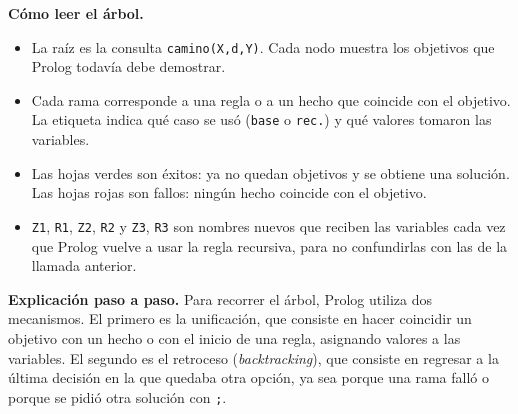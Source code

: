 \documentclass[12pt,letterpaper]{article}
\begin{document}
\noindent\textbf{Cómo leer el árbol.}
\begin{itemize}
  \item La raíz es la consulta \texttt{camino(X,d,Y)}. Cada nodo muestra los
  objetivos que Prolog todavía debe demostrar.
  \item Cada rama corresponde a una regla o a un hecho que coincide con el
  objetivo. La etiqueta indica qué caso se usó (\texttt{base} o \texttt{rec.}) y
  qué valores tomaron las variables.
  \item Las hojas verdes son éxitos: ya no quedan objetivos y se obtiene una
  solución. Las hojas rojas son fallos: ningún hecho coincide con el objetivo.
  \item \texttt{Z1}, \texttt{R1}, \texttt{Z2}, \texttt{R2} y \texttt{Z3},
  \texttt{R3} son nombres nuevos que reciben las variables cada vez que Prolog
  vuelve a usar la regla recursiva, para no confundirlas con las de la llamada
  anterior.
\end{itemize}

\noindent\textbf{Explicación paso a paso.} Para recorrer el árbol, Prolog utiliza dos
mecanismos. El primero es la unificación, que consiste en hacer coincidir un
objetivo con un hecho o con el inicio de una regla, asignando valores a las
variables. El segundo es el retroceso (\emph{backtracking}), que consiste en
regresar a la última decisión en la que quedaba otra opción, ya sea porque una
rama falló o porque se pidió otra solución con \texttt{;}.
\end{document}
